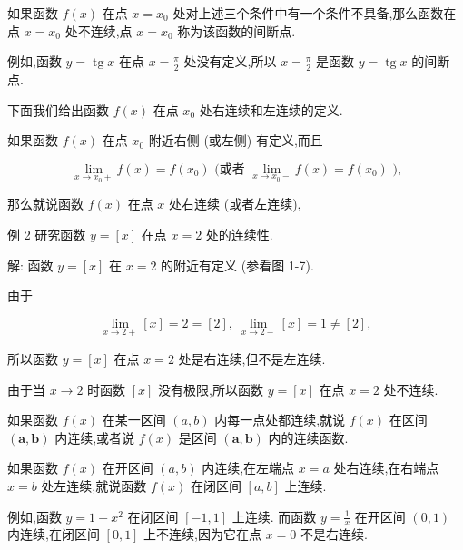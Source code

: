 \documentclass[10pt]{article}
\begin{document}
如果函数 \(f\left( x\right)\) 在点 \(x = {x}_{0}\) 处对上述三个条件中有一个条件不具备,那么函数在点 \(x = {x}_{0}\) 处不连续,点 \(x = {x}_{0}\) 称为该函数的间断点.

例如,函数 \(y = \operatorname{tg}x\) 在点 \(x = \frac{\pi }{2}\) 处没有定义,所以 \(x = \frac{\pi }{2}\) 是函数 \(y = \operatorname{tg}x\) 的间断点.

下面我们给出函数 \(f\left( x\right)\) 在点 \({x}_{0}\) 处右连续和左连续的定义.

如果函数 \(f\left( x\right)\) 在点 \({x}_{0}\) 附近右侧 (或左侧) 有定义,而且

\[
\mathop{\lim }\limits_{{x \rightarrow {x}_{0} + }}f\left( x\right) = f\left( {x}_{0}\right) \text{ (或者 }\mathop{\lim }\limits_{{x \rightarrow {x}_{0} - }}f\left( x\right) = f\left( {x}_{0}\right) \text{ ),}
\]

那么就说函数 \(f\left( x\right)\) 在点 \(x\) 处右连续 (或者左连续),

例 2 研究函数 \(y = \left\lbrack x\right\rbrack\) 在点 \(x = 2\) 处的连续性.

解: 函数 \(y = \left\lbrack x\right\rbrack\) 在 \(x = 2\) 的附近有定义 (参看图 1-7).

由于

\[
\mathop{\lim }\limits_{{x \rightarrow 2 + }}\left\lbrack x\right\rbrack = 2 = \left\lbrack 2\right\rbrack ,\;\mathop{\lim }\limits_{{x \rightarrow 2 - }}\left\lbrack x\right\rbrack = 1 \neq \left\lbrack 2\right\rbrack ,
\]

所以函数 \(y = \left\lbrack x\right\rbrack\) 在点 \(x = 2\) 处是右连续,但不是左连续.

由于当 \(x \rightarrow 2\) 时函数 \(\left\lbrack x\right\rbrack\) 没有极限,所以函数 \(y = \left\lbrack x\right\rbrack\) 在点 \(x = 2\) 处不连续.

如果函数 \(f\left( x\right)\) 在某一区间 \(\left( {a,b}\right)\) 内每一点处都连续,就说 \(f\left( x\right)\) 在区间 \(\left( {\mathbf{a},\mathbf{b}}\right)\) 内连续,或者说 \(f\left( x\right)\) 是区间 \(\left( {\mathbf{a},\mathbf{b}}\right)\) 内的连续函数.

如果函数 \(f\left( x\right)\) 在开区间 \(\left( {a,b}\right)\) 内连续,在左端点 \(x = a\) 处右连续,在右端点 \(x = b\) 处左连续,就说函数 \(f\left( x\right)\) 在闭区间 \(\left\lbrack {a,b}\right\rbrack\) 上连续.

例如,函数 \(y = 1 - {x}^{2}\) 在闭区间 \(\left\lbrack {-1,1}\right\rbrack\) 上连续. 而函数 \(y = \frac{1}{x}\) 在开区间 \(\left( {0,1}\right)\) 内连续,在闭区间 \(\left\lbrack {0,1}\right\rbrack\) 上不连续,因为它在点 \(x = 0\) 不是右连续.
\end{document}
